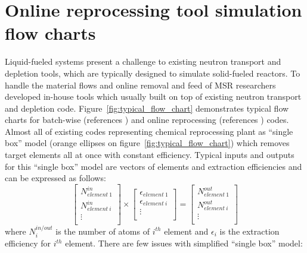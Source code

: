 \section{Online reprocessing tool simulation flow charts}
Liquid-fueled systems present a challenge to existing neutron transport and depletion tools, which are typically designed to simulate solid-fueled reactors. To handle the material flows and online removal and feed of \gls{MSR} researchers developed in-house 
tools which usually built on top of existing neutron transport and depletion code. Figure~\ref{fig:typical_flow_chart} demonstrates typical flow charts for batch-wise 
(references \cite{betzler_molten_2017, li_optimization_2018, 
rykhlevskii_modeling_2019, zhou_fuel_2018-1,sheu_depletion_2013,park_whole_2015}) and 
online reprocessing (references \cite{heuer_simulation_2010, doligez_coupled_2014,  heuer_towards_2014, fiorina_investigation_2013, nuttin_potential_2005, aufiero_extended_2013, de_troullioud_de_lanversin_toward_2017}) codes. Almost all of 
existing codes representing chemical reprocessing plant as ``single box'' 
model (orange ellipses on figure~\ref{fig:typical_flow_chart}) which removes target 
elements all at once with constant efficiency. Typical inputs and outputs for this 
``single box'' model are vectors of elements and extraction efficiencies and can be 
expressed as follows:
\begin{equation}
\begin{bmatrix}
N^{in}_{element \: 1} \\ N^{in}_{element \: i} \\ \vdots \\
\end{bmatrix} 
\times
\begin{bmatrix}
\epsilon_{element \: 1} \\ \epsilon_{element \: i} \\ \vdots \\
\end{bmatrix} =
\begin{bmatrix}
N^{out}_{element \: 1} \\ N^{out}_{element \: i} \\ \vdots \\
\end{bmatrix}
\end{equation}
where $N^{in/out}_i$ is the number of atoms of $i^{th}$ element and $\epsilon_i$ is the 
extraction efficiency for $i^{th}$ element. There are few issues with simplified 
``single box'' model: 
